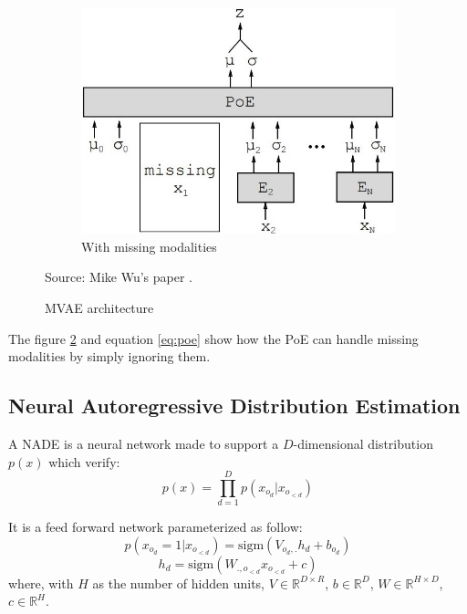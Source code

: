 \documentclass[12pt]{report}
\begin{document}
\begin{figure}[h]
\begin{subfigure}[t]{0.49\textwidth}
        \includegraphics[width=.9 \textwidth]{images/nn/architectures/mvae_missing.jpg}
        \caption{With missing modalities}
        \label{fig:mvae_architecture_missing}
    \end{subfigure}
    \caption{MVAE architecture}
    Source: Mike Wu's paper \cite{wu_multimodal_2018}.
    \label{fig:mvae_architecture}
\end{figure}

The figure \ref{fig:mvae_architecture} and equation \ref{eq:poe} show how the PoE can handle missing modalities by simply ignoring them.

\subsection{Neural Autoregressive Distribution Estimation}
\label{sec:back:nade}

A NADE \cite{uria_neural_2016, uria_deep_2014} is a neural network made to support a $D$-dimensional distribution $p(x)$ which verify:
\begin{equation}
    p(x) = \prod_{d=1}^{D} p(x_{o_{d}} | x_{o_{<d}})
\end{equation}

It is a feed forward network parameterized as follow:
\begin{equation}
    p(x_{o_{d}} = 1 | x_{o_{<d}}) = \text{sigm}(V_{o_{d}, .} h_{d} + b_{o_{d}})
\end{equation}
\begin{equation}
    h_d = \text{sigm}(W_{., o_{<d}} x_{o_{<d}} + c)
\end{equation}
where, with $H$ as the number of hidden units, $V \in \mathbb{R}^{D \times R}$, $b \in \mathbb{R}^{D}$, $W \in \mathbb{R}^{H \times D}$, $c \in \mathbb{R}^{H}$.
\end{document}

